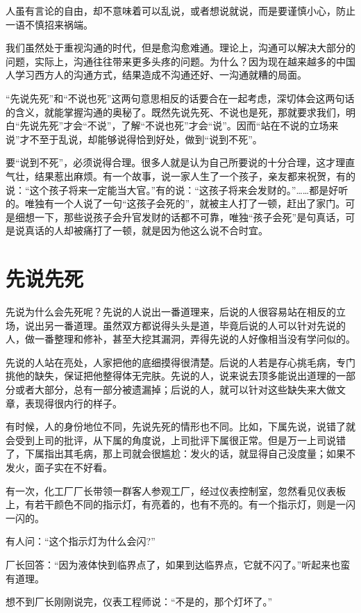 \documentclass[fontset=fandol, a4paper, 12pt, openright]{ctexbook}
\begin{document}
人虽有言论的自由，却不意味着可以乱说，或者想说就说，而是要谨慎小心，防止一语不慎招来祸端。

我们虽然处于重视沟通的时代，但是愈沟愈难通。理论上，沟通可以解决大部分的问题，实际上，沟通往往带来更多头疼的问题。为什么？因为现在越来越多的中国人学习西方人的沟通方式，结果造成不沟通还好、一沟通就糟的局面。

“先说先死”和“不说也死”这两句意思相反的话要合在一起考虑，深切体会这两句话的含义，就能掌握沟通的奥秘了。既然先说先死、不说也是死，那就要求我们，明白“先说先死”才会“不说”，了解“不说也死”才会“说”。因而“站在不说的立场来说”才不至于乱说，却能够说得恰到好处，做到“说到不死”。

要“说到不死”，必须说得合理。很多人就是认为自己所要说的十分合理，这才理直气壮，结果惹出麻烦。有一个故事，说一家人生了一个孩子，亲友都来祝贺，有的说：“这个孩子将来一定能当大官。”有的说：“这孩子将来会发财的。”……都是好听的。唯独有一个人说了一句“这孩子会死的”，就被主人打了一顿，赶出了家门。可是细想一下，那些说孩子会升官发财的话都不可靠，唯独“孩子会死”是句真话，可是说真话的人却被痛打了一顿，就是因为他这么说不合时宜。


\section{先说先死}

先说为什么会先死呢？先说的人说出一番道理来，后说的人很容易站在相反的立场，说出另一番道理。虽然双方都说得头头是道，毕竟后说的人可以针对先说的人，做一番整理和修补，甚至大挖其漏洞，弄得先说的人好像相当没有学问似的。

先说的人站在亮处，人家把他的底细摸得很清楚。后说的人若是存心挑毛病，专门挑他的缺失，保证把他整得体无完肤。先说的人，说来说去顶多能说出道理的一部分或者大部分，总有一部分被遗漏掉；后说的人，就可以针对这些缺失来大做文章，表现得很内行的样子。

有时候，人的身份地位不同，先说先死的情形也不同。比如，下属先说，说错了就会受到上司的批评，从下属的角度说，上司批评下属很正常。但是万一上司说错了，下属指出其毛病，那上司就会很尴尬：发火的话，就显得自己没度量；如果不发火，面子实在不好看。

有一次，化工厂厂长带领一群客人参观工厂，经过仪表控制室，忽然看见仪表板上，有若干颜色不同的指示灯，有亮着的，也有不亮的。有一个指示灯，则是一闪一闪的。

有人问：“这个指示灯为什么会闪?”

厂长回答：“因为液体快到临界点了，如果到达临界点，它就不闪了。”听起来也蛮有道理。

想不到厂长刚刚说完，仪表工程师说：“不是的，那个灯坏了。”
\end{document}
